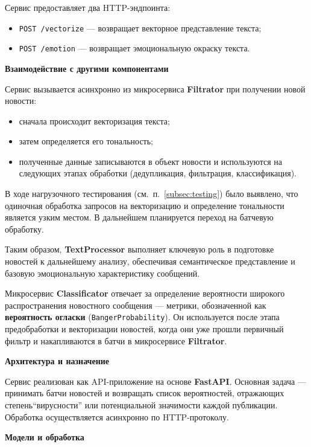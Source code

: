 Сервис предоставляет два HTTP-эндпоинта:
\begin{itemize}
    \item \texttt{POST /vectorize} — возвращает векторное представление текста;
    \item \texttt{POST /emotion} — возвращает эмоциональную окраску текста.
\end{itemize}

\textbf{Взаимодействие с другими компонентами}

Сервис вызывается асинхронно из микросервиса \textbf{Filtrator} при получении новой новости:
\begin{itemize}
    \item сначала происходит векторизация текста;
    \item затем определяется его тональность;
    \item полученные данные записываются в объект новости и используются на следующих этапах обработки (дедупликация, фильтрация, классификация).
\end{itemize}

В ходе нагрузочного тестирования (см.\ п.~\ref{subsec:testing}) было выявлено, что одиночная обработка запросов на векторизацию и определение тональности является узким местом. В дальнейшем планируется переход на батчевую обработку.

Таким образом, \textbf{TextProcessor} выполняет ключевую роль в подготовке новостей к дальнейшему анализу, обеспечивая семантическое представление и базовую эмоциональную характеристику сообщений.

Микросервис \textbf{Classificator} отвечает за определение вероятности широкого распространения новостного сообщения — метрики, обозначенной как \textbf{вероятность огласки} (\texttt{BangerProbability}).
Он используется после этапа предобработки и векторизации новостей, когда они уже прошли первичный фильтр и накапливаются в батчи в микросервисе \textbf{Filtrator}.

\textbf{Архитектура и назначение}

Сервис реализован как API-приложение на основе \textbf{FastAPI}.
Основная задача — принимать батчи новостей и возвращать список вероятностей, отражающих степень``вирусности'' или потенциальной значимости каждой публикации.
Обработка осуществляется асинхронно по HTTP-протоколу.

\textbf{Модели и обработка}

